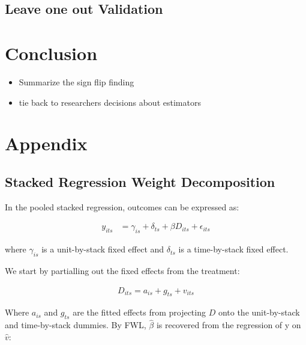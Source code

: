 \documentclass[12pt]{article}
\begin{document}
\subsection{Leave one out Validation}

\section{Conclusion}

\begin{itemize}
    \item Summarize the sign flip finding
    \item tie back to researchers decisions about estimators
\end{itemize}

\newpage

\printbibliography

\newpage

\section*{Appendix}

\setcounter{table}{0}
\setcounter{figure}{0}

\renewcommand{\thetable}{A.\arabic{table}}
\renewcommand{\thefigure}{A.\arabic{figure}}


\subsection*{Stacked Regression Weight Decomposition}

In the pooled stacked regression, outcomes can be expressed as:

\begin{align*}
    y_{its} &= \gamma_{is} + \delta_{ts} + \beta D_{its} + \epsilon_{its}
\end{align*}

where $\gamma_{is}$ is a unit-by-stack fixed effect and $\delta_{ts}$ is a time-by-stack fixed effect. 

We start by partialling out the fixed effects from the treatment:

\begin{align*}
    D_{its} = a_{is} + g_{ts} + v_{its}
\end{align*}

Where $a_{is}$ and $g_{ts}$ are the fitted effects from projecting $D$ onto the unit-by-stack and time-by-stack dummies. By FWL, $\hat{\beta}$ is recovered from the regression of y on $\hat{v}$:
\end{document}
